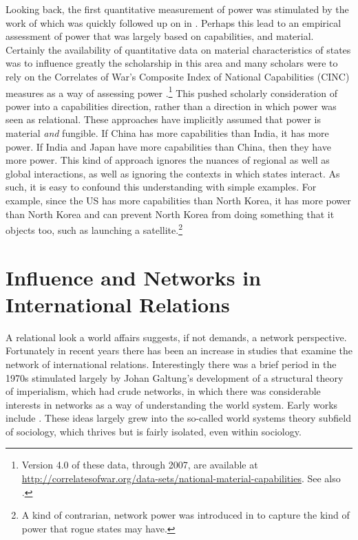 \documentclass[12pt,oneside,doublespace,pdflatex]{amsart}
\begin{document}
Looking back, the first quantitative measurement of power was stimulated by the work of \cite{fucks:1965} which was quickly followed up on in \cite{morgenstern:1974}.  Perhaps this lead to an empirical assessment of power that was largely based on capabilities, and material.  Certainly the availability of quantitative data on material characteristics of states was to influence
greatly the scholarship in this area and many scholars were to rely on the Correlates of War's Composite Index of National Capabilities (CINC) measures as a way of assessing power \citep{singer:etal:1972}.\footnote{Version 4.0 of these data, 
through 2007, are available at \url{http://correlatesofwar.org/data-sets/national-material-capabilities}. See also \citet{park:ward:1988}.}  This pushed scholarly consideration of power into a capabilities direction, rather than a direction in which power was seen as relational.  These approaches have implicitly assumed that power is material 
{\em and} fungible. If China has more capabilities than India, it has more power. If India and Japan have more capabilities than China, then they have more power. This kind of approach ignores the nuances of regional as well as global interactions, as well as ignoring the contexts in which states interact.  As such, it is easy to confound this understanding with simple examples. For example, since the US has more capabilities than North Korea, it has more power than North Korea and can prevent North Korea from doing something that it objects too, such as launching a satellite.\footnote{A kind of contrarian, network power was introduced in \cite{ward:house:1988,house:ward:1988} to capture the kind of power that rogue states may have.}

\section{Influence and Networks in International Relations}

A relational look a world affairs suggests, if not demands, a network perspective.  Fortunately in recent years there has been an increase in studies that examine the network of international relations.
Interestingly there was a brief period in the 1970s stimulated largely by
Johan Galtung's development of a structural theory of imperialism, which had crude networks, 
\citeyear{galtung:1971} in which there was considerable interests in networks as a way of understanding
the world system.  Early works include 
\cite{skjelsbaek:1972,chasedunn:rubinson:1977,bornschier:metal:1979,chirot:hall:1982}. These ideas largely grew into the
so-called world systems theory subfield of sociology, which thrives but is fairly isolated, even within sociology.
\end{document}
